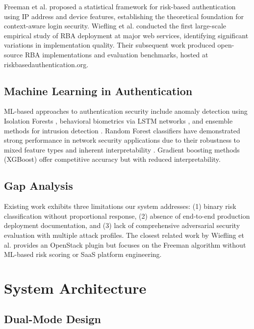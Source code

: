 \documentclass[conference]{IEEEtran}
\begin{document}
Freeman et al. \cite{freeman2016} proposed a statistical framework for risk-based authentication using IP address and device features, establishing the theoretical foundation for context-aware login security. Wiefling et al. \cite{wiefling2019} conducted the first large-scale empirical study of RBA deployment at major web services, identifying significant variations in implementation quality. Their subsequent work \cite{wiefling2021, wiefling2023} produced open-source RBA implementations and evaluation benchmarks, hosted at riskbasedauthentication.org.

\subsection{Machine Learning in Authentication}

ML-based approaches to authentication security include anomaly detection using Isolation Forests \cite{liu2008}, behavioral biometrics via LSTM networks \cite{acien2021}, and ensemble methods for intrusion detection \cite{zhang2020}. Random Forest classifiers have demonstrated strong performance in network security applications due to their robustness to mixed feature types and inherent interpretability \cite{breiman2001}. Gradient boosting methods (XGBoost) \cite{chen2016} offer competitive accuracy but with reduced interpretability.

\subsection{Gap Analysis}

Existing work exhibits three limitations our system addresses: (1) binary risk classification without proportional response, (2) absence of end-to-end production deployment documentation, and (3) lack of comprehensive adversarial security evaluation with multiple attack profiles. The closest related work by Wiefling et al. \cite{wiefling2023} provides an OpenStack plugin but focuses on the Freeman algorithm without ML-based risk scoring or SaaS platform engineering.

\section{System Architecture}

\subsection{Dual-Mode Design}
\end{document}
